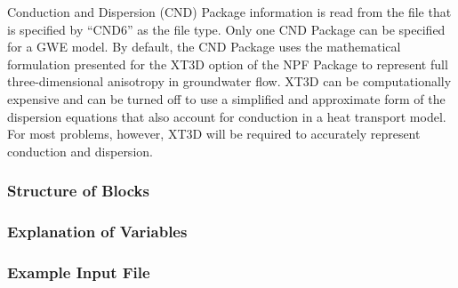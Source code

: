 Conduction and Dispersion (CND) Package information is read from the file that is specified by ``CND6'' as the file type.  Only one CND Package can be specified for a GWE model.  By default, the CND Package uses the mathematical formulation presented for the XT3D option of the NPF Package to represent full three-dimensional anisotropy in groundwater flow.  XT3D can be computationally expensive and can be turned off to use a simplified and approximate form of the dispersion equations that also account for conduction in a heat transport model.  For most problems, however, XT3D will be required to accurately represent conduction and dispersion.

\vspace{5mm}
\subsubsection{Structure of Blocks}



\vspace{5mm}
\subsubsection{Explanation of Variables}
\begin{description}

\end{description}

\vspace{5mm}
\subsubsection{Example Input File}


